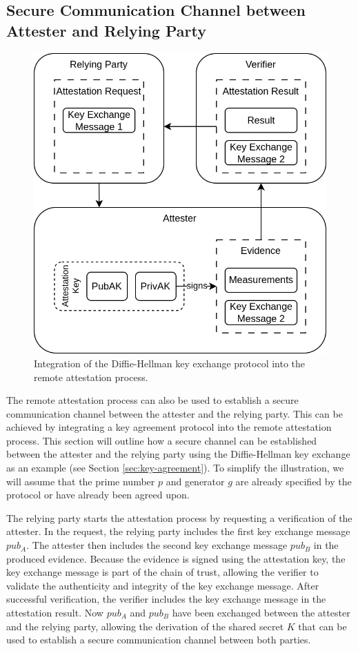 \subsection{Secure Communication Channel between Attester and Relying Party}
\label{sec:ra-secure-communication-channel}

\begin{figure}[H]
  \centering
  \includegraphics[width=0.5\linewidth]{resources/ra-key-exchange.drawio.png}
  \caption{Integration of the Diffie-Hellman key exchange protocol into the remote attestation process.}
  \label{fig:ra-key-exchange}
\end{figure}

The remote attestation process can also be used to establish a secure
communication channel between the attester and the relying party. This can be
achieved by integrating a key agreement protocol into the remote attestation
process. This section will outline how a secure channel can be established
between the attester and the relying party using the Diffie-Hellman key exchange
as an example (see Section \ref{sec:key-agreement}). To simplify the
illustration, we will assume that the prime number $p$ and generator $g$ are
already specified by the protocol or have already been agreed upon.

The relying party starts the attestation process by requesting a verification of
the attester. In the request, the relying party includes the first key exchange
message $pub_A$. The attester then includes the second key exchange message
$pub_B$ in the produced evidence. Because the evidence is signed using the
attestation key, the key exchange message is part of the chain of trust,
allowing the verifier to validate the authenticity and integrity of the key
exchange message. After successful verification, the verifier includes the key
exchange message in the attestation result. Now $pub_A$ and $pub_B$ have been
exchanged between the attester and the relying party, allowing the derivation of
the shared secret $K$ that can be used to establish a secure communication
channel between both parties.

